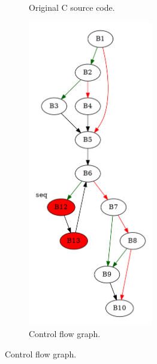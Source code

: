 \begin{figure}[htbp]
	\centering
	\begin{subfigure}[b]{0.30\textwidth}
		\centering
		
		\caption{Original C source code.}
	\end{subfigure}
	\begin{subfigure}[b]{0.50\textwidth}
		\centering
		\includegraphics[width=0.6\textwidth]{inc/appendices/examples/hammock/counter-example/jump-threading-and-short-circuit/jump-threading-and-short-circuit_jump/f_0002a.png}
		\caption{Control flow graph.}
	\end{subfigure}
\end{figure}

